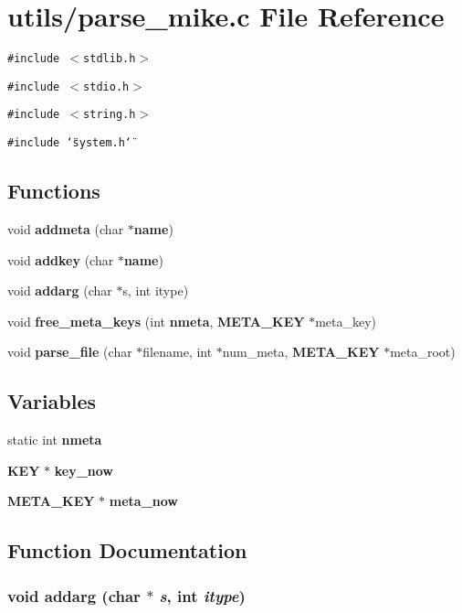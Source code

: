 \section{utils/parse\_\-mike.c File Reference}
\label{utils_2parse__mike_8c}
{\tt \#include $<$stdlib.h$>$}\par
{\tt \#include $<$stdio.h$>$}\par
{\tt \#include $<$string.h$>$}\par
{\tt \#include \char`\"{}system.h\char`\"{}}\par
\subsection*{Functions}
\begin{CompactItemize}
\item 
void {\bf addmeta} (char $\ast${\bf name})
\item 
void {\bf addkey} (char $\ast${\bf name})
\item 
void {\bf addarg} (char $\ast$s, int itype)
\item 
void {\bf free\_\-meta\_\-keys} (int {\bf nmeta}, {\bf META\_\-KEY} $\ast$meta\_\-key)
\item 
void {\bf parse\_\-file} (char $\ast$filename, int $\ast$num\_\-meta, {\bf META\_\-KEY} $\ast$meta\_\-root)
\end{CompactItemize}
\subsection*{Variables}
\begin{CompactItemize}
\item 
static int {\bf nmeta}
\item 
{\bf KEY} $\ast$ {\bf key\_\-now}
\item 
{\bf META\_\-KEY} $\ast$ {\bf meta\_\-now}
\end{CompactItemize}


\subsection{Function Documentation}
\subsubsection{\setlength{\rightskip}{0pt plus 5cm}void addarg (char $\ast$ {\em s}, int {\em itype})}\label{utils_2parse__mike_8c_7217964e959b5c46d570958f3b4cb0b0}


